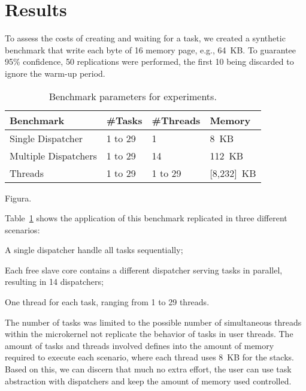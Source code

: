 \section{Results}
\label{sec:results}

	To assess the costs of creating and waiting for a task, we created
	a synthetic benchmark that write each byte of 16 memory page, e.g., 64~KB.
	To guarantee 95\% confidence, 50 replications were performed, the first 10
	being discarded to ignore the warm-up period.

	\begin{table}[]
	\centering
	\caption{Benchmark parameters for experiments.}
	\label{tab:parameters}
	\begin{tabular}{llll}
	\toprule
			\textbf{Benchmark}   & \textbf{\#Tasks} & \textbf{\#Threads} & \textbf{Memory} \\
			\midrule
			Single Dispatcher    & 1 to 29          & 1                  & 8~KB            \\
			Multiple Dispatchers & 1 to 29          & 14                 & 112~KB          \\
			Threads              & 1 to 29          & 1 to 29            & [8,232]~KB      \\
			\bottomrule
	\end{tabular}
	\end{table}

 Figura.

	Table~\ref{tab:parameters} shows the application of this benchmark replicated in three
	different scenarios:
	\begin{enumerate*}[label=(\roman*)]
		\item A single dispatcher handle all tasks sequentially;
		\item Each free slave core contains a different dispatcher serving
			tasks in parallel, resulting in 14 dispatchers;
		\item One thread for each task, ranging from 1 to 29 threads.
	\end{enumerate*}
	The number of tasks was limited to the possible number of simultaneous
	threads within the microkernel not replicate the behavior of tasks in user
	threads. The amount of tasks and threads involved defines into the amount
	of memory required to execute each scenario, where each thread uses 8~KB
	for the stacks. Based on this, we can discern that much no extra effort,
	the user can use task abstraction with dispatchers and keep the amount of
	memory used controlled.

